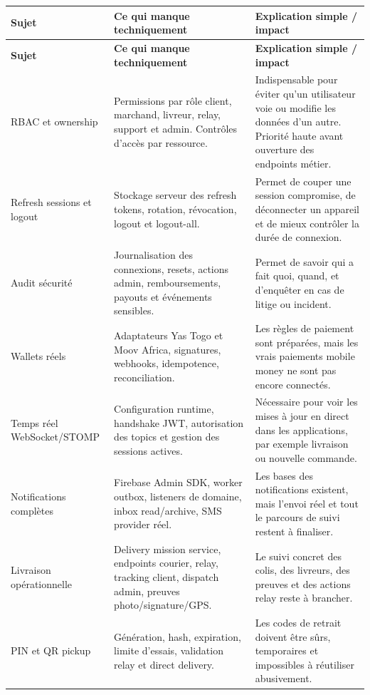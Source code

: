 \documentclass[11pt,letterpaper]{article}
\begin{document}
{\footnotesize
\begin{longtable}{@{}L{3.35cm}L{6.15cm}L{6.7cm}@{}}
\toprule
{}
\textbf{Sujet} & \textbf{Ce qui manque techniquement} & \textbf{Explication simple / impact} \\
\midrule
\endfirsthead
\toprule
{}
\textbf{Sujet} & \textbf{Ce qui manque techniquement} & \textbf{Explication simple / impact} \\
\midrule
\endhead
RBAC et ownership & Permissions par rôle client, marchand, livreur, relay, support et admin. Contrôles d'accès par ressource. & Indispensable pour éviter qu'un utilisateur voie ou modifie les données d'un autre. Priorité haute avant ouverture des endpoints métier. \\
Refresh sessions et logout & Stockage serveur des refresh tokens, rotation, révocation, logout et logout-all. & Permet de couper une session compromise, de déconnecter un appareil et de mieux contrôler la durée de connexion. \\
Audit sécurité & Journalisation des connexions, resets, actions admin, remboursements, payouts et événements sensibles. & Permet de savoir qui a fait quoi, quand, et d'enquêter en cas de litige ou incident. \\
Wallets réels & Adaptateurs Yas Togo et Moov Africa, signatures, webhooks, idempotence, reconciliation. & Les règles de paiement sont préparées, mais les vrais paiements mobile money ne sont pas encore connectés. \\
Temps réel WebSocket/STOMP & Configuration runtime, handshake JWT, autorisation des topics et gestion des sessions actives. & Nécessaire pour voir les mises à jour en direct dans les applications, par exemple livraison ou nouvelle commande. \\
Notifications complètes & Firebase Admin SDK, worker outbox, listeners de domaine, inbox read/archive, SMS provider réel. & Les bases des notifications existent, mais l'envoi réel et tout le parcours de suivi restent à finaliser. \\
Livraison opérationnelle & Delivery mission service, endpoints courier, relay, tracking client, dispatch admin, preuves photo/signature/GPS. & Le suivi concret des colis, des livreurs, des preuves et des actions relay reste à brancher. \\
PIN et QR pickup & Génération, hash, expiration, limite d'essais, validation relay et direct delivery. & Les codes de retrait doivent être sûrs, temporaires et impossibles à réutiliser abusivement. \\

\end{longtable}}
\end{document}
